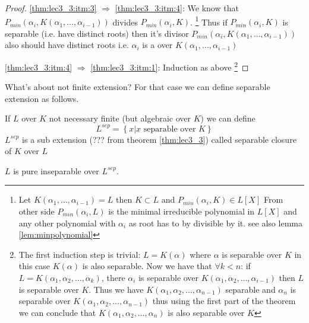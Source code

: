 \begin{theorem}
\begin{proof}
    \ref{thm:lec3_3:itm:3} $\Rightarrow$ \ref{thm:lec3_3:itm:4}:
    We know that
    $P_{min}\left(\alpha_i, K\left(\alpha_1, \dots,
    \alpha_{i-1}\right)\right)$ divides
    $P_{min}\left(\alpha_i, K\right)$.
    \footnote{
      Let $K\left(\alpha_1, \dots, \alpha_{i-1}\right) = L$
      then $K \subset L$ and
      $P_{min}\left(\alpha_i, K\right) \in L\left[ X \right]$
      From other side $P_{min}\left(\alpha_i, L\right)$ is the minimal
      irreducible polynomial  in $L\left[X\right]$ and any other
      polynomial with $\alpha_i$ as root has to by divisible by it.
      see also lemma \ref{lem:minpolynomial}
    }
    Thus if 
    $P_{min}\left(\alpha_i, K\right)$ is separable (i.e. have distinct
    roots) then it's divisor $P_{min}\left(\alpha_i, K\left(\alpha_1, \dots,
    \alpha_{i-1}\right)\right)$ also should have distinct roots i.e.
    $\alpha_i$ is a  over
    $K\left(\alpha_1, \dots,\alpha_{i-1}\right)$
    
    \ref{thm:lec3_3:itm:4} $\Rightarrow$ \ref{thm:lec3_3:itm:1}:
    Induction as above
    \footnote{
      The first induction step is trivial: $L=K\left(\alpha\right)$
      where $\alpha$ is separable over $K$ in this case
      $K\left(\alpha\right)$ is also separable.
      Now we have that $\forall k < n$:
      if $L = K\left(\alpha_1, \alpha_2, \dots, \alpha_k\right)$, there
      $\alpha_i$ is separable over
      $K\left(\alpha_1, \alpha_2, \dots, \alpha_{i-1}\right)$ then $L$
      is separable over $K$. Thus we have
      $K\left(\alpha_1, \alpha_2, \dots, \alpha_{n-1}\right)$
      separable and $\alpha_n$ is separable over $K\left(\alpha_1,
      \alpha_2, \dots, \alpha_{n-1}\right)$ thus using the first part
      of the theorem we can conclude that 
      $K\left(\alpha_1, \alpha_2, \dots, \alpha_{n}\right)$ is also
      separable over $K$
    }    
  \end{proof}
  \label{thm:lec3_3}
\end{theorem}

What's about not finite extension? For that case we can define
separable extension as follows.
\begin{definition}
  If $L$ over $K$ not necessary finite (but algebraic over $K$) we can
  define
  \[
  L^{sep} = \left\{x \vert x \mbox{ separable over } K \right\}
  \]
  $L^{sep}$ is a sub extension (??? from theorem \ref{thm:lec3_3})
  called separable closure of $K$ over
  $L$
  \label{def:separableclosure}
\end{definition}
$L$ is pure inseparable over $L^{sep}$.


